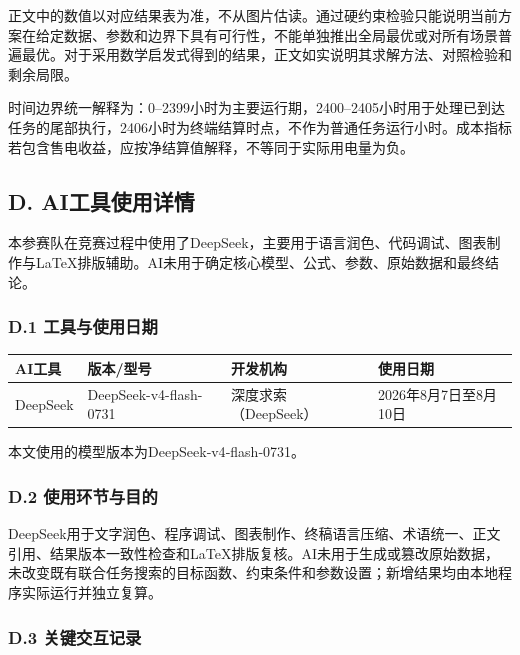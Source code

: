 正文中的数值以对应结果表为准，不从图片估读。通过硬约束检验只能说明当前方案在给定数据、参数和边界下具有可行性，不能单独推出全局最优或对所有场景普遍最优。对于采用数学启发式得到的结果，正文如实说明其求解方法、对照检验和剩余局限。

时间边界统一解释为：0--2399小时为主要运行期，2400--2405小时用于处理已到达任务的尾部执行，2406小时为终端结算时点，不作为普通任务运行小时。成本指标若包含售电收益，应按净结算值解释，不等同于实际用电量为负。

\subsection*{D. AI工具使用详情}

本参赛队在竞赛过程中使用了DeepSeek，主要用于语言润色、代码调试、图表制作与LaTeX排版辅助。AI未用于确定核心模型、公式、参数、原始数据和最终结论。

\subsubsection*{D.1 工具与使用日期}

\begin{table}[H]
    \centering
    \small
    \renewcommand{\arraystretch}{1.05}
    \setlength{\tabcolsep}{3pt}
    \begin{tabularx}{0.96\textwidth}{>{\centering\arraybackslash}p{}>{\centering\arraybackslash}p{}>{\centering\arraybackslash}X>{\centering\arraybackslash}p{}}
        \toprule
        AI工具 & 版本/型号 & 开发机构 & 使用日期 \\
        \midrule
        DeepSeek & DeepSeek-v4-flash-0731 & 深度求索（DeepSeek） & 2026年8月7日至8月10日 \\
        \bottomrule
    \end{tabularx}
\end{table}

本文使用的模型版本为DeepSeek‐v4‐flash‐0731。

\subsubsection*{D.2 使用环节与目的}

DeepSeek用于文字润色、程序调试、图表制作、终稿语言压缩、术语统一、正文引用、结果版本一致性检查和LaTeX排版复核。AI未用于生成或篡改原始数据，未改变既有联合任务搜索的目标函数、约束条件和参数设置；新增结果均由本地程序实际运行并独立复算。

\subsubsection*{D.3 关键交互记录}


